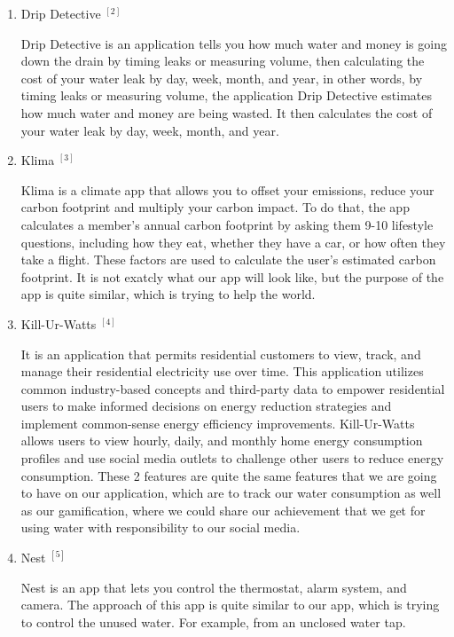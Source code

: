 \documentclass[10pt]{article}
\begin{document}
\begin{multicols}{2}
\begin{enumerate}
  \item {Drip Detective ${ }^{[2]}$}
  
  Drip Detective is an application tells you how much water and money is going down the drain by timing leaks or measuring volume, then calculating the cost of your water leak by day, week, month, and year, in other words, by timing leaks or measuring volume, the application Drip Detective estimates how much water and money are being wasted. It then calculates the cost of your water leak by day, week, month, and year.

  \item {Klima ${ }^{[3]}$}
  
  Klima is a climate app that allows you to offset your emissions, reduce your carbon footprint and multiply your carbon impact. To do that, the app calculates a member's annual carbon footprint by asking them 9-10 lifestyle questions, including how they eat, whether they have a car, or how often they take a flight. These factors are used to calculate the user's estimated carbon footprint. It is not exatcly what our app will look like, but the purpose of the app is quite similar, which is trying to help the world.

  \item {Kill-Ur-Watts ${ }^{[4]}$}
  
  It is an application that permits residential customers to view, track, and manage their residential electricity use over time. This application utilizes common industry-based concepts and third-party data to empower residential users to make informed decisions on energy reduction strategies and implement common-sense energy efficiency improvements. Kill-Ur-Watts allows users to view hourly, daily, and monthly home energy consumption profiles and use social media outlets to challenge other users to reduce energy consumption. These 2 features are quite the same features that we are going to have on our application, which are to track our water consumption as well as our gamification, where we could share our achievement that we get for using water with responsibility to our social media.

  \item {Nest ${ }^{[5]}$}
  
  Nest is an app that lets you control the thermostat, alarm system, and camera. The approach of this app is quite similar to our app, which is trying to control the unused water. For example, from an unclosed water tap.

\end{enumerate}



\end{multicols}
\end{document}
